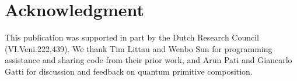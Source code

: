 \documentclass[acmsmall]{acmart}
\theoremstyle{definition}
\theoremstyle{definition}
\begin{document}
 

\maketitle







\section*{Acknowledgment}
This publication was supported in part by the Dutch Research Council (VI.Veni.222.439). We thank Tim Littau and Wenbo Sun for programming assistance and sharing code from their prior work, and Arun Pati and Giancarlo Gatti for discussion and feedback on quantum primitive composition.
 
 

 








 
\end{document}
